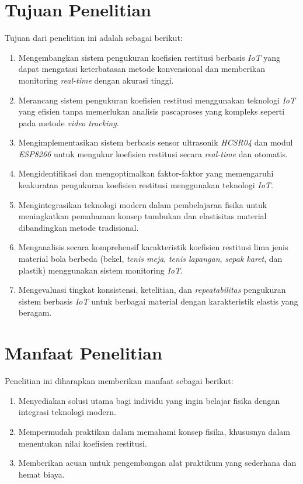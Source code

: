 \section{Tujuan Penelitian}
 Tujuan dari penelitian ini adalah sebagai berikut:
\begin{enumerate}
\item Mengembangkan sistem pengukuran koefisien restitusi berbasis \textit{IoT} yang dapat mengatasi keterbatasan metode konvensional dan memberikan monitoring \textit{real-time} dengan akurasi tinggi.
\item Merancang sistem pengukuran koefisien restitusi menggunakan teknologi \textit{IoT} yang efisien tanpa memerlukan analisis pascaproses yang kompleks seperti pada metode \textit{video tracking}.
\item Mengimplementasikan sistem berbasis sensor ultrasonik \textit{HCSR04} dan modul \textit{ESP8266} untuk mengukur koefisien restitusi secara \textit{real-time} dan otomatis.
\item Mengidentifikasi dan mengoptimalkan faktor-faktor yang memengaruhi keakuratan pengukuran koefisien restitusi menggunakan teknologi \textit{IoT}.
\item Mengintegrasikan teknologi modern dalam pembelajaran fisika untuk meningkatkan pemahaman konsep tumbukan dan elastisitas material dibandingkan metode tradisional.
\item Menganalisis secara komprehensif karakteristik koefisien restitusi lima jenis material bola berbeda (bekel, \textit{tenis meja}, \textit{tenis lapangan}, \textit{sepak karet}, dan plastik) menggunakan sistem monitoring \textit{IoT}.
\item Mengevaluasi tingkat konsistensi, ketelitian, dan \textit{repeatabilitas} pengukuran sistem berbasis \textit{IoT} untuk berbagai material dengan karakteristik elastis yang beragam.
\end{enumerate}

\section{Manfaat Penelitian}
 Penelitian ini diharapkan memberikan manfaat sebagai berikut:
\begin{enumerate}
\item Menyediakan solusi utama bagi individu yang ingin belajar fisika dengan integrasi teknologi modern.
\item Mempermudah praktikan dalam memahami konsep fisika, khususnya dalam menentukan nilai koefisien restitusi.
\item Memberikan acuan untuk pengembangan alat praktikum yang sederhana dan hemat biaya.
\end{enumerate}

